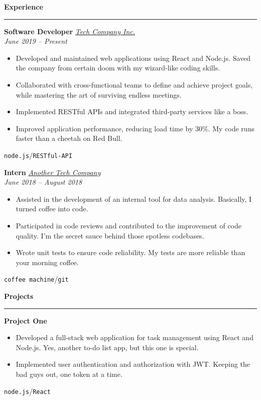 \documentclass[a4paper,11pt]{article}
\newcommand{\sectiontitle}[1]{\vspace{1em}\textbf{\Large #1}\par\vspace{-1em}\noindent\rule{\linewidth}{0.3mm}\par\vspace{0.3em}}
\newcommand{\slashsep}{\hspace{3mm}/\hspace{3mm}}
\begin{document}
\begin{minipage}[t]{0.65\textwidth-0.5\columnsep}
	\sectiontitle{Experience}

	\textbf{\large Software Developer} \hfill \href{https://github.com/klepp0/resume}{\textit{Tech Company Inc.}}\\
	\textit{June 2019 -- Present}
	\vspace{-0.8em}
	\begin{itemize}
		\item Developed and maintained web applications using React and Node.js. Saved the company from certain doom with my wizard-like coding skills.
		\item Collaborated with cross-functional teams to define and achieve project goals, while mastering the art of surviving endless meetings.
		\item Implemented RESTful APIs and integrated third-party services like a boss.
		\item Improved application performance, reducing load time by 30\%. My code runs faster than a cheetah on Red Bull.
	\end{itemize}
	\vspace{-0.8em}
	\texttt{node.js}\slashsep\texttt{RESTful-API}
	\vspace{0.5em}

	\textbf{\large Intern} \hfill \href{https://github.com/klepp0/resume}{\textit{Another Tech Company}}\\
	\textit{June 2018 -- August 2018}
	\vspace{-0.8em}
	\begin{itemize}
		\item Assisted in the development of an internal tool for data analysis. Basically, I turned coffee into code.
		\item Participated in code reviews and contributed to the improvement of code quality. I'm the secret sauce behind those spotless codebases.
		\item Wrote unit tests to ensure code reliability. My tests are more reliable than your morning coffee.
	\end{itemize}
	\vspace{-0.8em}
	\texttt{coffee machine}\slashsep\texttt{git}

	\sectiontitle{Projects}

	\textbf{\large Project One}
	\vspace{-0.8em}
	\begin{itemize}
		\item Developed a full-stack web application for task management using React and Node.js. Yes, another to-do list app, but this one is special.
		\item Implemented user authentication and authorization with JWT. Keeping the bad guys out, one token at a time.
	\end{itemize}
	\vspace{-0.8em}
	\texttt{node.js}\slashsep\texttt{React}
	\vspace{0.5em}


\end{minipage}
\end{document}
